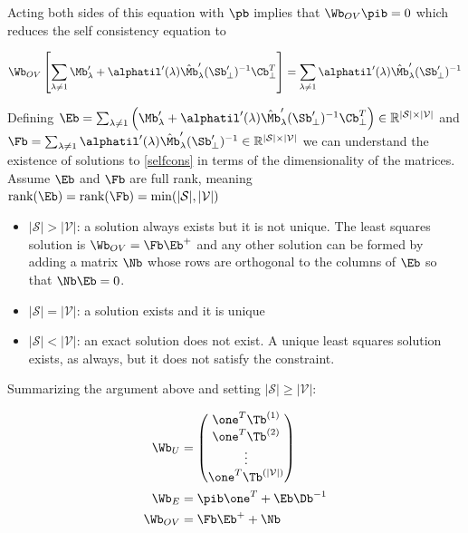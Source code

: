 \documentclass{article}
\begin{document}
Acting both sides of this equation with $\pb$ implies that $\Wb_{OV}\pib = 0$ which reduces the self consistency equation to  

\begin{equation}\label{selfcons}
    \Wb_{OV}\left[ \sum_{\lambda \neq 1} \Mb'_\lambda + \alphatil'(\lambda) \hat{\Mb}'_\lambda (\Sb'_\perp)^{-1}\Cb_\perp^T\right ] = \sum_{\lambda\neq 1} \alphatil'(\lambda) \hat{\Mb}'_\lambda (\Sb'_\perp)^{-1}
\end{equation}

Defining $\Eb = \sum_{\lambda \neq 1} \left(\Mb'_\lambda + \alphatil'(\lambda) \hat{\Mb}'_\lambda (\Sb'_\perp)^{-1}\Cb_\perp^T\right) \in \mathbb{R}^{|\mathcal{S}|\times |\mathcal{V}|}$ and $\Fb = \sum_{\lambda\neq 1} \alphatil'(\lambda) \hat{\Mb}'_\lambda (\Sb'_\perp)^{-1} \in \mathbb{R}^{|\mathcal{S}|\times |\mathcal{V}|}$ we can understand the existence of solutions to \eqref{selfcons} in terms of the dimensionality of the matrices. Assume $\Eb$ and $\Fb$ are full rank, meaning $\textrm{rank}(\Eb) = \textrm{rank}(\Fb) = \min(|\mathcal{S}|,|\mathcal{V}|)$

\begin{itemize}
    \item $\mathbf{|\mathcal{S}| > |\mathcal{V}|}$: a solution always exists but it is not unique. The least squares solution is $\Wb_{OV} = \Fb \Eb^+$ and any other solution can be formed by adding a matrix $\Nb$ whose rows are orthogonal to the columns of $\Eb$ so that $\Nb \Eb = 0$. 
    \item $\mathbf{|\mathcal{S}| = |\mathcal{V}|}$: a solution exists and it is unique
    \item $\mathbf{|\mathcal{S}| < |\mathcal{V}|}$: an exact solution does not exist. A unique least squares solution exists, as always, but it does not satisfy the constraint.
\end{itemize}
Summarizing the argument above and setting $|\mathcal{S}| \ge |\mathcal{V}|$:

\begin{align}
    \Wb_U &= \begin{pmatrix}
        \one^T \Tb^{(1)} \\
        \one^T \Tb^{(2)} \\
        \vdots\\
        \one^T \Tb^{(|\mathcal{V}|)} \label{wu_summ}
    \end{pmatrix} \\
    \Wb_E &= \pib \one^T + \Eb \Db^{-1} \\
    \Wb_{OV} &= \Fb \Eb^+ + \Nb \label{wov_summ}
\end{align}
\end{document}
